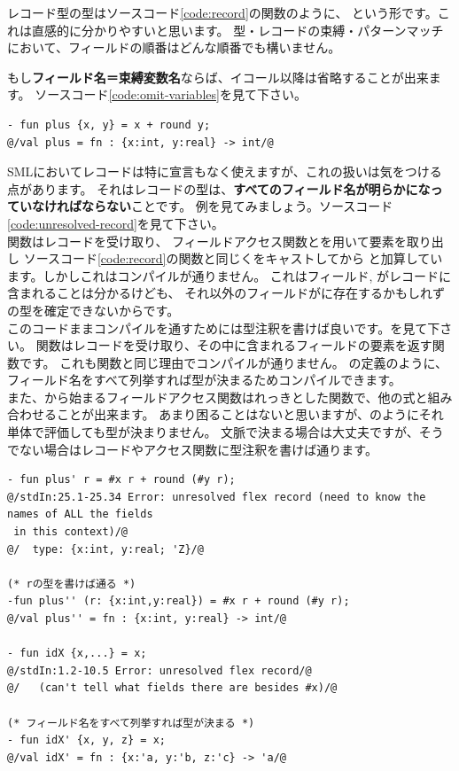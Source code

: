 \documentclass[11pt,a4paper]{jarticle}
\begin{document}
レコード型の型はソースコード\ref{code:record}の関数のように、
という形です。これは直感的に分かりやすいと思います。
型・レコードの束縛・パターンマッチにおいて、フィールドの順番はどんな順番でも構いません。

もし\textbf{フィールド名＝束縛変数名}ならば、イコール以降は省略することが出来ます。
ソースコード\ref{code:omit-variables}を見て下さい。

\begin{lstlisting}[caption=レコードのパターンマッチ時の変数名の省略,label=code:omit-variables]
- fun plus {x, y} = x + round y;
@/val plus = fn : {x:int, y:real} -> int/@
\end{lstlisting}

SMLにおいてレコードは特に宣言もなく使えますが、これの扱いは気をつける点があります。
それはレコードの型は、\textbf{すべてのフィールド名が明らかになっていなければならない}ことです。
例を見てみましょう。ソースコード\ref{code:unresolved-record}を見て下さい。\\
関数はレコードを受け取り、
フィールドアクセス関数とを用いて要素を取り出し
ソースコード\ref{code:record}の関数と同じくをキャストしてから
と加算しています。しかしこれはコンパイルが通りません。
これはフィールド, がレコードに含まれることは分かるけども、
それ以外のフィールドがに存在するかもしれずの型を確定できないからです。\\
このコードままコンパイルを通すためには型注釈を書けば良いです。を見て下さい。
関数はレコードを受け取り、その中に含まれるフィールドの要素を返す関数です。
これも関数と同じ理由でコンパイルが通りません。
の定義のように、フィールド名をすべて列挙すれば型が決まるためコンパイルできます。\\
また、\prog{#}から始まるフィールドアクセス関数はれっきとした関数で、他の式と組み合わせることが出来ます。
あまり困ることはないと思いますが、のようにそれ単体で評価しても型が決まりません。
文脈で決まる場合は大丈夫ですが、そうでない場合はレコードやアクセス関数に型注釈を書けば通ります。

\begin{lstlisting}[caption=フィールド名が解決出来ない例,label=code:unresolved-record]
- fun plus' r = #x r + round (#y r);
@/stdIn:25.1-25.34 Error: unresolved flex record (need to know the names of ALL the fields
 in this context)/@
@/  type: {x:int, y:real; 'Z}/@

(* rの型を書けば通る *)
-fun plus'' (r: {x:int,y:real}) = #x r + round (#y r);
@/val plus'' = fn : {x:int, y:real} -> int/@

- fun idX {x,...} = x;
@/stdIn:1.2-10.5 Error: unresolved flex record/@
@/   (can't tell what fields there are besides #x)/@

(* フィールド名をすべて列挙すれば型が決まる *)
- fun idX' {x, y, z} = x;
@/val idX' = fn : {x:'a, y:'b, z:'c} -> 'a/@
\end{lstlisting}
\end{document}
